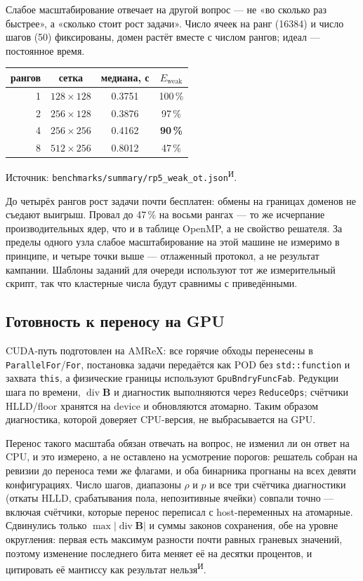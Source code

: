 \documentclass[12pt,a4paper]{article}
\newcommand{\divg}{\operatorname{div}}
\newcommand{\B}{\mathbf{B}}
\newcommand{\code}[1]{\texttt{#1}}
\newcommand{\Iz}{\textsuperscript{\scriptsize И}}    %
\begin{document}
Слабое масштабирование отвечает на другой вопрос --- не «во сколько раз
быстрее», а «сколько стоит рост задачи». Число ячеек на ранг (16384) и число
шагов (50) фиксированы, домен растёт вместе с числом рангов; идеал --- постоянное
время.

\begin{center}\footnotesize
\begin{tabular}{rccc}
\toprule
рангов & сетка & медиана, с & $E_{\text{weak}}$ \\
\midrule
1 & $128\times128$ & 0.3751 & 100\,\% \\
2 & $256\times128$ & 0.3876 & 97\,\% \\
4 & $256\times256$ & 0.4162 & \textbf{90\,\%} \\
8 & $512\times256$ & 0.8012 & 47\,\% \\
\bottomrule
\end{tabular}
\end{center}
\noindent\footnotesize
Источник: \code{benchmarks/summary/rp5\_weak\_ot.json}\Iz.\normalsize

\medskip
До четырёх рангов рост задачи почти бесплатен: обмены на границах доменов не
съедают выигрыш. Провал до 47\,\% на восьми рангах --- то же исчерпание
производительных ядер, что и в таблице OpenMP, а не свойство решателя. За
пределы одного узла слабое масштабирование на этой машине не измеримо в
принципе, и четыре точки выше --- отлаженный протокол, а не результат кампании.
Шаблоны заданий для очереди используют тот же измерительный скрипт, так что
кластерные числа будут сравнимы с приведёнными.

\subsection{Готовность к переносу на GPU}
\label{sec:res-gpu}

CUDA-путь подготовлен на AMReX: все горячие обходы перенесены в
\code{ParallelFor}/\code{For}, постановка задачи передаётся как POD без
\code{std::function} и захвата \code{this}, а физические границы используют
\code{GpuBndryFuncFab}. Редукции шага по времени, $\divg\B$ и диагностик
выполняются через \code{ReduceOps}; счётчики HLLD/floor хранятся на device и
обновляются атомарно. Таким образом диагностика, которой доверяет CPU-версия,
не выбрасывается на GPU.

Перенос такого масштаба обязан отвечать на вопрос, не изменил ли он ответ на
CPU, и это измерено, а не оставлено на усмотрение порогов: решатель собран на
ревизии до переноса теми же флагами, и оба бинарника прогнаны на всех девяти
конфигурациях. Число шагов, диапазоны $\rho$ и $p$ и все три счётчика
диагностики (откаты HLLD, срабатывания пола, непозитивные ячейки) совпали
точно --- включая счётчики, которые перенос переписал с host-переменных на
атомарные. Сдвинулись только $\max|\divg\B|$ и суммы законов сохранения, обе на
уровне округления: первая есть максимум разности почти равных граневых
значений, поэтому изменение последнего бита меняет её на десятки процентов, и
цитировать её мантиссу как результат нельзя\Iz.
\end{document}
